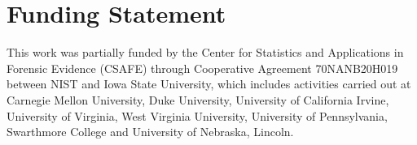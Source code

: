 \hypertarget{funding-statement}{%
\section{Funding Statement}\label{funding-statement}}

This work was partially funded by the Center for Statistics and
Applications in Forensic Evidence (CSAFE) through Cooperative Agreement
70NANB20H019 between NIST and Iowa State University, which includes
activities carried out at Carnegie Mellon University, Duke University,
University of California Irvine, University of Virginia, West Virginia
University, University of Pennsylvania, Swarthmore College and
University of Nebraska, Lincoln.




\address{%
Joseph Zemmels\\
Iowa State University\\%
2438 Osborn Drive\\ Ames, IA 50011\\
%
%
%
\\\href{mailto:jzemmels@iastate.edu}{\nolinkurl{jzemmels@iastate.edu}}
}

\address{%
Susan VanderPlas\\
Department of Statistics\\%
University of Nebraska - Lincoln\\ 340 Hardin Hall North Wing\\ Lincoln,
NE 68583\\
%
%
%
\\\href{mailto:susan.vanderplas@unl.edu}{\nolinkurl{susan.vanderplas@unl.edu}}
}

\address{%
Heike Hofmann\\
Iowa State University\\%
Center for Statistics and Applications in Forensic Evidence\\ Department
of Statistics\\ 2438 Osborn Drive\\ Ames, IA 50011\\
%
%
%
\\\href{mailto:hofmann@iastate.edu}{\nolinkurl{hofmann@iastate.edu}}
}


